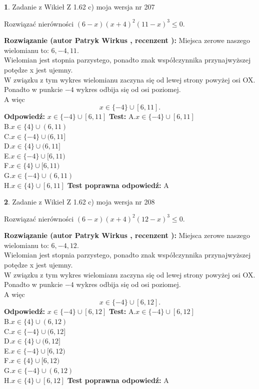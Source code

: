 \documentclass[12pt, a4paper]{article}
\theoremstyle{definition} %
\newtheorem{zad}{}
\newcommand{\zadStart}[1]{\begin{zad}#1\newline}
\newcommand{\zadStop}{\end{zad}}
\newcommand{\rozwStart}[2]{\noindent \textbf{Rozwiązanie (autor #1 , recenzent #2): }\newline}
\newcommand{\rozwStop}{\newline}
\newcommand{\odpStart}{\noindent \textbf{Odpowiedź:}\newline}
\newcommand{\odpStop}{\newline}
\newcommand{\testStart}{\noindent \textbf{Test:}\newline}
\newcommand{\testStop}{\newline}
\newcommand{\kluczStart}{\noindent \textbf{Test poprawna odpowiedź:}\newline}
\newcommand{\kluczStop}{\newline}
\begin{document}
\zadStart{Zadanie z Wikieł Z 1.62 c) moja wersja nr 207}

Rozwiązać nierówności $(6-x)(x+4)^{2}(11-x)^{3}\le0$.
\zadStop
\rozwStart{Patryk Wirkus}{}
Miejsca zerowe naszego wielomianu to: $6, -4, 11$.\\
Wielomian jest stopnia parzystego, ponadto znak współczynnika przy\linebreak najwyższej potędze x jest ujemny.\\ W związku z tym wykres wielomianu zaczyna się od lewej strony powyżej osi OX.\\
Ponadto w punkcie $-4$ wykres odbija się od osi poziomej.\\
A więc $$x \in \{-4\} \cup [6,11].$$
\rozwStop
\odpStart
$x \in \{-4\} \cup [6,11]$
\odpStop
\testStart
A.$x \in \{-4\} \cup [6,11]$\\
B.$x \in \{4\} \cup (6,11)$\\
C.$x \in \{-4\} \cup (6,11]$\\
D.$x \in \{4\} \cup (6,11]$\\
E.$x \in \{-4\} \cup [6,11)$\\
F.$x \in \{4\} \cup [6,11)$\\
G.$x \in \{-4\} \cup (6,11)$\\
H.$x \in \{4\} \cup [6,11]$
\testStop
\kluczStart
A
\kluczStop



\zadStart{Zadanie z Wikieł Z 1.62 c) moja wersja nr 208}

Rozwiązać nierówności $(6-x)(x+4)^{2}(12-x)^{3}\le0$.
\zadStop
\rozwStart{Patryk Wirkus}{}
Miejsca zerowe naszego wielomianu to: $6, -4, 12$.\\
Wielomian jest stopnia parzystego, ponadto znak współczynnika przy\linebreak najwyższej potędze x jest ujemny.\\ W związku z tym wykres wielomianu zaczyna się od lewej strony powyżej osi OX.\\
Ponadto w punkcie $-4$ wykres odbija się od osi poziomej.\\
A więc $$x \in \{-4\} \cup [6,12].$$
\rozwStop
\odpStart
$x \in \{-4\} \cup [6,12]$
\odpStop
\testStart
A.$x \in \{-4\} \cup [6,12]$\\
B.$x \in \{4\} \cup (6,12)$\\
C.$x \in \{-4\} \cup (6,12]$\\
D.$x \in \{4\} \cup (6,12]$\\
E.$x \in \{-4\} \cup [6,12)$\\
F.$x \in \{4\} \cup [6,12)$\\
G.$x \in \{-4\} \cup (6,12)$\\
H.$x \in \{4\} \cup [6,12]$
\testStop
\kluczStart
A
\kluczStop
\end{document}
